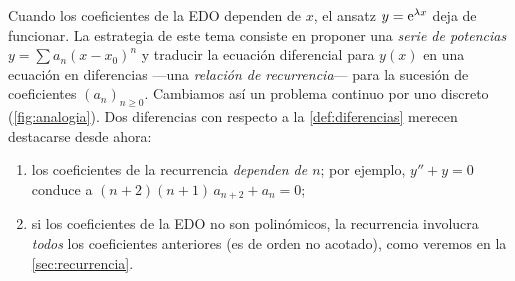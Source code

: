 Cuando los coeficientes de la EDO dependen de $x$, el ansatz
$y=\mathrm{e}^{\lambda x}$ deja de funcionar. La estrategia de este tema consiste
en proponer una \emph{serie de potencias} $y=\sum a_n(x-x_0)^n$ y traducir la
ecuación diferencial para $y(x)$ en una ecuación en diferencias ---una
\emph{relación de recurrencia}--- para la sucesión de coeficientes
$(a_n)_{n\ge0}$. Cambiamos así un problema continuo por uno discreto
(\cref{fig:analogia}). Dos diferencias con respecto a la
\cref{def:diferencias} merecen destacarse desde ahora:
\begin{enumerate}[label=(\roman*)]
  \item los coeficientes de la recurrencia \emph{dependen de $n$}; por
        ejemplo, $y''+y=0$ conduce a $(n+2)(n+1)\,a_{n+2}+a_n=0$;
  \item si los coeficientes de la EDO no son polinómicos, la recurrencia
        involucra \emph{todos} los coeficientes anteriores (es de orden no
        acotado), como veremos en la \cref{sec:recurrencia}.
\end{enumerate}


